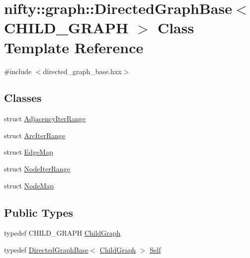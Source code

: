 \hypertarget{classnifty_1_1graph_1_1DirectedGraphBase}{}\section{nifty\+:\+:graph\+:\+:Directed\+Graph\+Base$<$ C\+H\+I\+L\+D\+\_\+\+G\+R\+A\+P\+H $>$ Class Template Reference}
\label{classnifty_1_1graph_1_1DirectedGraphBase}


{\ttfamily \#include $<$directed\+\_\+graph\+\_\+base.\+hxx$>$}

\subsection*{Classes}
\begin{DoxyCompactItemize}
\item 
struct \hyperlink{structnifty_1_1graph_1_1DirectedGraphBase_1_1AdjacencyIterRange}{Adjacency\+Iter\+Range}
\item 
struct \hyperlink{structnifty_1_1graph_1_1DirectedGraphBase_1_1ArcIterRange}{Arc\+Iter\+Range}
\item 
struct \hyperlink{structnifty_1_1graph_1_1DirectedGraphBase_1_1EdgeMap}{Edge\+Map}
\item 
struct \hyperlink{structnifty_1_1graph_1_1DirectedGraphBase_1_1NodeIterRange}{Node\+Iter\+Range}
\item 
struct \hyperlink{structnifty_1_1graph_1_1DirectedGraphBase_1_1NodeMap}{Node\+Map}
\end{DoxyCompactItemize}
\subsection*{Public Types}
\begin{DoxyCompactItemize}
\item 
typedef C\+H\+I\+L\+D\+\_\+\+G\+R\+A\+P\+H \hyperlink{classnifty_1_1graph_1_1DirectedGraphBase_a583e01641aec296b9bc33a346f90a216}{Child\+Graph}
\item 
typedef \hyperlink{classnifty_1_1graph_1_1DirectedGraphBase}{Directed\+Graph\+Base}$<$ \hyperlink{classnifty_1_1graph_1_1DirectedGraphBase_a583e01641aec296b9bc33a346f90a216}{Child\+Graph} $>$ \hyperlink{classnifty_1_1graph_1_1DirectedGraphBase_ae772bf5744b9fe1af63eb1418b7ab261}{Self}
\end{DoxyCompactItemize}

